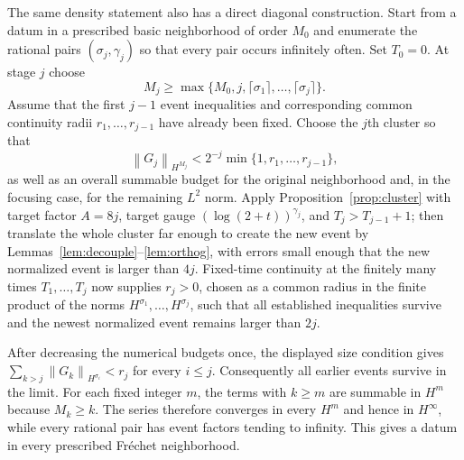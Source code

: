 \documentclass[11pt,reqno]{amsart}
\numberwithin{equation}{section}
\theoremstyle{remark}
\newcommand{\norm}[1]{\left\lVert #1\right\rVert}
\begin{document}
The same density statement also has a direct diagonal construction.  Start from a
datum in a prescribed basic neighborhood of order $M_0$ and enumerate the
rational pairs $(\sigma_j,\gamma_j)$ so that every pair occurs infinitely
often.  Set $T_0=0$.  At stage $j$ choose
\[
 M_j\geq\max\{M_0,j,\lceil\sigma_1\rceil,\ldots,
 \lceil\sigma_j\rceil\}.
\]
Assume that the first $j-1$ event inequalities and corresponding common
continuity radii $r_1,\ldots,r_{j-1}$ have already been fixed.  Choose the
$j$th cluster so that
\[
 \norm{G_j}_{H^{M_j}}
 <2^{-j}\min\{1,r_1,\ldots,r_{j-1}\},
\]
as well as an overall summable budget for the original neighborhood and, in
the focusing case, for the remaining $L^2$ norm.  Apply
Proposition~\ref{prop:cluster} with target factor $A=8j$, target gauge
$(\log(2+t))^{\gamma_j}$, and $T_j>T_{j-1}+1$; then translate the whole
cluster far enough to create the new event by
Lemmas~\ref{lem:decouple}--\ref{lem:orthog}, with errors small enough that the
new normalized event is larger than $4j$.  Fixed-time continuity at the
finitely many times $T_1,\ldots,T_j$ now supplies $r_j>0$, chosen as a common
radius in the finite product of the norms
$H^{\sigma_1},\ldots,H^{\sigma_j}$, such that all established inequalities
survive and the newest normalized event remains larger than $2j$.

After decreasing the numerical budgets once, the displayed size condition
gives $\sum_{k>j}\norm{G_k}_{H^{\sigma_i}}<r_j$ for every $i\leq j$.
Consequently all earlier events survive in the limit.  For each fixed integer
$m$, the terms with $k\geq m$ are summable in
$H^m$ because $M_k\geq k$.  The series therefore converges in every $H^m$
and hence in $H^\infty$, while every rational pair has event factors tending
to infinity.  This gives a datum in every prescribed Fr\'echet neighborhood.
\end{document}
